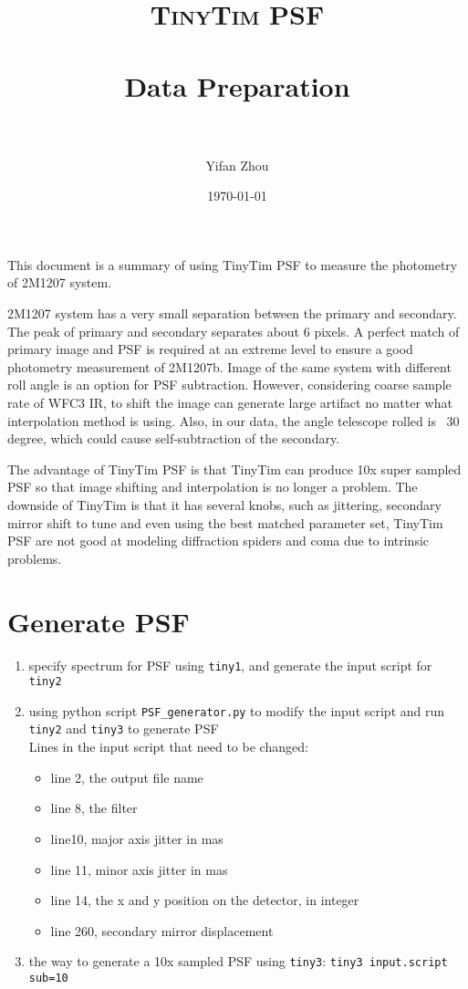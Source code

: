\documentclass[paper=letter, fontsize=11pt]{scrartcl} %
\title{ 
\normalfont \normalsize 
\textsc{TinyTim PSF} \\ [25pt] %
\horrule{0.5pt} \\[0.4cm] %
\huge Data Preparation\\ %
\horrule{2pt} \\[0.5cm] %
}
\author{Yifan Zhou} %
\date{\normalsize\today} %
\numberwithin{equation}{section} %
\numberwithin{figure}{section} %
\numberwithin{table}{section} %
\begin{document}
\maketitle %

This document is a summary of using TinyTim PSF to measure the
photometry of 2M1207 system.

2M1207 system has a very small separation between the primary and
secondary. The peak of primary and secondary separates about 6
pixels. A perfect match of primary image and PSF is required at an
extreme level to ensure a good photometry measurement of
2M1207b. Image of the same system with different roll angle is an
option for PSF subtraction. However, considering coarse sample rate of
WFC3 IR, to shift the image can generate large artifact no matter what
interpolation method is using. Also, in our data, the angle telescope
rolled is ~30 degree, which could cause self-subtraction of the
secondary.

The advantage of TinyTim PSF is that TinyTim can produce 10x super
sampled PSF so that image shifting and interpolation is no longer a
problem. The downside of TinyTim is that it has several knobs, such as
jittering, secondary mirror shift to tune and even using the best
matched parameter set, TinyTim PSF are not good at modeling
diffraction spiders and coma due to intrinsic problems. 

\section{Generate PSF}

\begin{enumerate}
  \item specify spectrum for PSF using \texttt{tiny1}, and generate
    the input script for \texttt{tiny2}
  \item using python script \texttt{PSF\_generator.py} to modify the
    input script and run \texttt{tiny2} and \texttt{tiny3} to generate
    PSF\\
    Lines in the input script that need to be changed:
    
    \begin{itemize}
    \item line 2, the output file name
    \item line 8, the filter
    \item line10, major axis jitter in mas
    \item line 11, minor axis jitter in mas
    \item line 14, the x and y position on the detector, in integer
    \item line 260, secondary mirror displacement
    \end{itemize}
    \item the way to generate a 10x sampled PSF using \texttt{tiny3}:
      \texttt{tiny3 input.script sub=10}
\end{enumerate}
\end{document}
